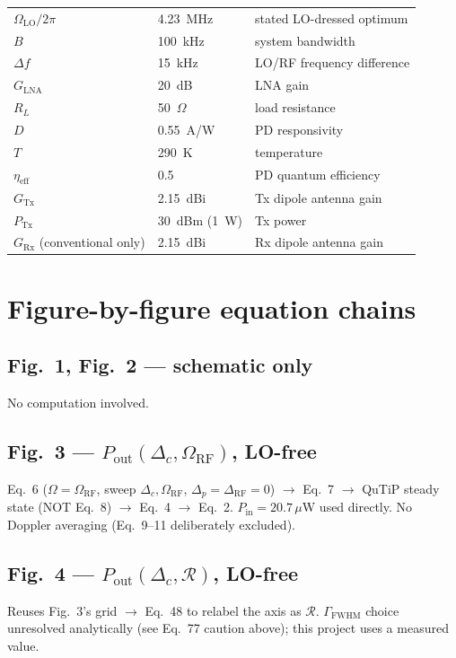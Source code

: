 \documentclass[11pt]{article}
\begin{document}
\begin{center}
\begin{tabular}{@{}lll@{}}
$\Omega_\text{LO}/2\pi$ & 4.23~MHz & stated LO-dressed optimum\\
$B$ & 100~kHz & system bandwidth\\
$\Delta f$ & 15~kHz & LO/RF frequency difference\\
$G_\text{LNA}$ & 20~dB & LNA gain\\
$R_L$ & 50~$\Omega$ & load resistance\\
$D$ & 0.55~A/W & PD responsivity\\
$T$ & 290~K & temperature\\
$\eta_\text{eff}$ & 0.5 & PD quantum efficiency\\
$G_\text{Tx}$ & 2.15~dBi & Tx dipole antenna gain\\
$P_\text{Tx}$ & 30~dBm (1~W) & Tx power\\
$G_\text{Rx}$ (conventional only) & 2.15~dBi & Rx dipole antenna gain\\
\bottomrule
\end{tabular}
\end{center}

\section{Figure-by-figure equation chains}

\subsection*{Fig.~1, Fig.~2 --- schematic only}
No computation involved.

\subsection*{Fig.~3 --- $P_\text{out}(\Delta_c,\Omega_\text{RF})$, LO-free}
Eq.~6 ($\Omega=\Omega_\text{RF}$, sweep $\Delta_c,\Omega_\text{RF}$,
$\Delta_p=\Delta_\text{RF}=0$) $\to$ Eq.~7 $\to$ QuTiP steady state (NOT
Eq.~8) $\to$ Eq.~4 $\to$ Eq.~2. $P_\text{in}=20.7\,\mu$W used directly.
No Doppler averaging (Eq.~9--11 deliberately excluded).

\subsection*{Fig.~4 --- $P_\text{out}(\Delta_c,\mathcal R)$, LO-free}
Reuses Fig.~3's grid $\to$ Eq.~48 to relabel the axis as $\mathcal R$.
$\Gamma_\text{FWHM}$ choice unresolved analytically (see Eq.~77 caution
above); this project uses a measured value.
\end{document}
